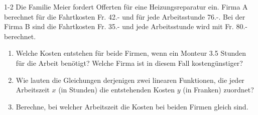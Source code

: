 \begin{exsol@exercise}{1-2}
    Die Familie Meier fordert Offerten f\"ur eine Heizungsreparatur
    ein. Firma A berechnet f\"ur die Fahrtkosten Fr. 42.- und f\"ur
    jede Arbeitsstunde 76.-. Bei der Firma B sind die Fahrtkosten
    Fr. 35.- und jede Arbeitsstunde wird mit Fr. 80.- berechnet.
    \begin{enumerate}[label=\alph*)]
    \item Welche Kosten entstehen f\"ur beide Firmen, wenn ein Monteur
      3.5 Stunden
      f\"ur die Arbeit benötigt? Welche Firma ist in diesem Fall
      kostengünstiger?

    \item Wie lauten die Gleichungen derjenigen zwei linearen
      Funktionen, die jeder Arbeitszeit $x$ (in Stunden) die
      entstehenden Kosten $y$ (in Franken) zuordnet?

    \item Berechne, bei welcher Arbeitszeit die Kosten bei beiden
      Firmen gleich sind.
    \end{enumerate}
\end{exsol@exercise}
